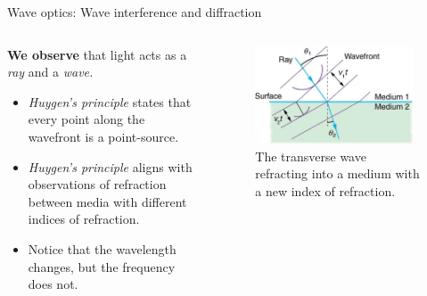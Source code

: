 \documentclass{beamer}
\begin{document}
\begin{frame}{Wave optics: Wave interference and diffraction}
\begin{columns}[T]
\begin{column}{0.5\textwidth}
\small
\textbf{We observe} that light acts as a \textit{ray} and a \textit{wave.}
\begin{itemize}
\item \textit{Huygen's principle} states that every point along the wavefront is a point-source.
\item \textit{Huygen's principle} aligns with observations of refraction between media with different indices of refraction.
\item Notice that the wavelength changes, but the frequency does not.
\end{itemize}
\end{column}
\begin{column}{0.5\textwidth}
\begin{figure}
\centering
\includegraphics[width=0.95\textwidth]{figures/wave4.png}
\caption{\label{fig:wave4} \footnotesize The transverse wave refracting into a medium with a new index of refraction.}
\end{figure}
\end{column}
\end{columns}
\end{frame}
\end{document}
